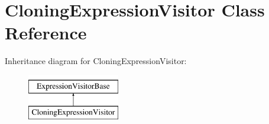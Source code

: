 \hypertarget{class_cloning_expression_visitor}{\section{Cloning\+Expression\+Visitor Class Reference}
\label{class_cloning_expression_visitor}
}
Inheritance diagram for Cloning\+Expression\+Visitor\+:\begin{figure}[H]
\begin{center}
\leavevmode
\includegraphics[height=2.000000cm]{class_cloning_expression_visitor}
\end{center}
\end{figure}
